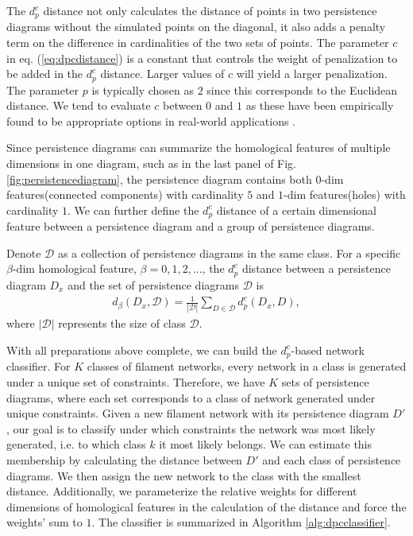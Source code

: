 \documentclass[10pt]{article}
\newcommand{\D}{{\mathcal{D}}}
\newenvironment{definition}[2][Definition]{\begin{trivlist}
\item[\hskip \labelsep {\bfseries #1}\hskip \labelsep {\bfseries #2.}]}{\end{trivlist}}
\begin{document}
The $d^c_p$ distance not only calculates the distance of points in two persistence diagrams without the simulated points on the diagonal, it also adds a penalty term on the difference in cardinalities of the two sets of points. The parameter $c$ in eq. (\ref{eq:dpcdistance}) is a constant that controls the weight of penalization to be added in the $d^c_p$ distance. Larger values of $c$ will yield a larger penalization. The parameter $p$ is typically chosen as $2$ since this corresponds to the Euclidean distance. We tend to evaluate $c$ between $0$ and $1$ as these have been empirically found to be appropriate options in real-world applications \cite{maroulas2018stable}.

Since persistence diagrams can summarize the homological features of multiple dimensions in one diagram, such as in the last panel of Fig. \ref{fig:persistencediagram}, the persistence diagram contains both $0$-dim features(connected components) with cardinality $5$ and $1$-dim features(holes) with cardinality $1$. We can further define the $d^c_p$ distance of a certain dimensional feature between a persistence diagram and a group of persistence diagrams.

\begin{definition}{2}
Denote $\D$ as a collection of persistence diagrams in the same class. For a specific $\beta$-dim homological feature, $\beta=0,1,2,...$, the $d^c_p$ distance between a persistence diagram $D_x$ and the set of persistence diagrams $\D$ is
\begin{align}
    d_\beta (D_x,\D)=\frac{1}{|\D|}\sum_{D \in \D} d^c_p(D_x,D),
    \label{dpcsets}
\end{align}
where $|\D|$ represents the size of class $\D$.
\end{definition}

With all preparations above complete, we can build the $d^c_p$-based network classifier. For $K$ classes of filament networks, every network in a class is generated under a unique set of constraints. Therefore, we have $K$ sets of persistence diagrams, where each set corresponds to a class of network generated under unique constraints. Given a new filament network with its persistence diagram $D'$, our goal is to classify under which constraints the network was most likely generated, i.e. to which class $k$ it most likely belongs. We can estimate this membership by calculating the distance between $D'$ and each class of persistence diagrams. We then assign the new network to the class with the smallest distance. Additionally, we parameterize the relative weights for different dimensions of homological features in the calculation of the distance and force the weights' sum to $1$. The classifier is summarized in Algorithm \ref{alg:dpcclassifier}.
\end{document}
